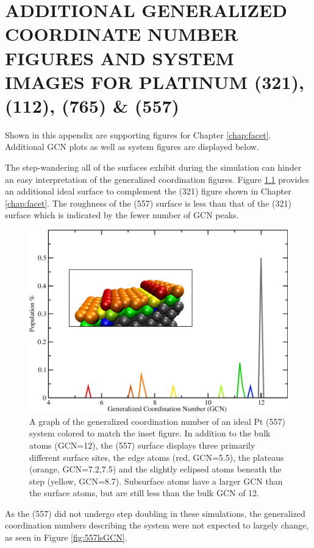 
\chapter{ADDITIONAL GENERALIZED COORDINATE NUMBER FIGURES AND SYSTEM IMAGES FOR PLATINUM (321), (112), (765) \& (557)}
\label{app:SI2}


Shown in this appendix are supporting figures for Chapter \ref{chap:facet}.
Additional GCN plots as well as system figures are displayed below.
\newpage



The step-wandering all of the surfaces exhibit during the simulation can hinder
an easy interpretation of the generalized coordination figures. Figure
\ref{fig:557GCN} provides an additional ideal surface to complement the (321)
figure shown in Chapter \ref{chap:facet}. The roughness of the (557) surface is
less than that of the (321) surface which is indicated by the fewer number of GCN
peaks. 

\begin{figure}
\centering
\includegraphics[width=0.9\linewidth]{../figures/appB/557_ideal_gcn.pdf}
\caption{A graph of the generalized coordination number of an ideal Pt (557)
system colored to match the inset figure. In addition to the bulk atoms (GCN=12), the
(557) surface displays three primarily different surface sites, the edge atoms
(red, GCN=5.5), the plateaus (orange, GCN=7.2,7.5) and the slightly eclipsed
atoms beneath the step (yellow, GCN=8.7). Subsurface atoms have a larger GCN
than the surface atoms, but are still less than the bulk GCN of 12.}
\label{fig:557GCN}
\end{figure}
\newpage


As the  (557) did not undergo step doubling in these simulations, the
generalized coordination numbers describing the system were not expected to
largely change, as seen in Figure \ref{fig:557lsGCN}.

